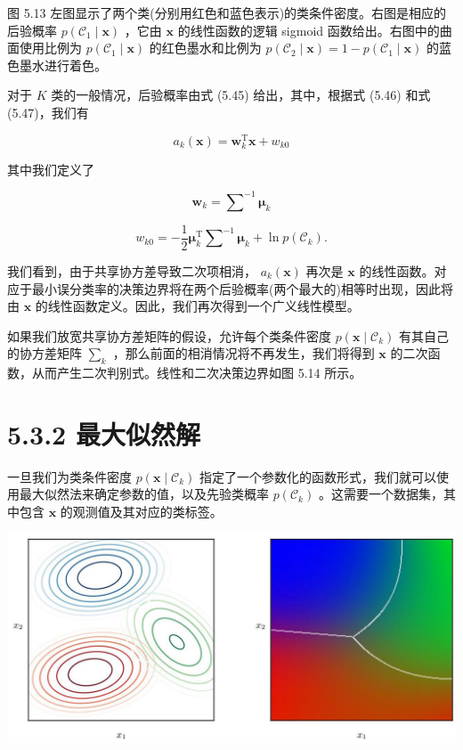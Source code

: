 \documentclass[10pt]{article}
\begin{document}
图 5.13 左图显示了两个类(分别用红色和蓝色表示)的类条件密度。右图是相应的后验概率 \(p\left( {{\mathcal{C}}_{1} \mid  \mathbf{x}}\right)\) ，它由 \(\mathbf{x}\) 的线性函数的逻辑 sigmoid 函数给出。右图中的曲面使用比例为 \(p\left( {{\mathcal{C}}_{1} \mid  \mathbf{x}}\right)\) 的红色墨水和比例为 \(p\left( {{\mathcal{C}}_{2} \mid  \mathbf{x}}\right)  = 1 - p\left( {{\mathcal{C}}_{1} \mid  \mathbf{x}}\right)\) 的蓝色墨水进行着色。

对于 \(K\) 类的一般情况，后验概率由式 (5.45) 给出，其中，根据式 (5.46) 和式 (5.47)，我们有

\[
{a}_{k}\left( \mathbf{x}\right)  = {\mathbf{w}}_{k}^{\mathrm{T}}\mathbf{x} + {w}_{k0} \tag{5.51}
\]

其中我们定义了

\[
{\mathbf{w}}_{k} = {\mathbf{\sum }}^{-1}{\mathbf{\mu }}_{k} \tag{5.52}
\]

\[
{w}_{k0} =  - \frac{1}{2}{\mathbf{\mu }}_{k}^{\mathrm{T}}{\mathbf{\sum }}^{-1}{\mathbf{\mu }}_{k} + \ln p\left( {\mathcal{C}}_{k}\right) . \tag{5.53}
\]

我们看到，由于共享协方差导致二次项相消， \({a}_{k}\left( \mathbf{x}\right)\) 再次是 \(\mathbf{x}\) 的线性函数。对应于最小误分类率的决策边界将在两个后验概率(两个最大的)相等时出现，因此将由 \(\mathbf{x}\) 的线性函数定义。因此，我们再次得到一个广义线性模型。

如果我们放宽共享协方差矩阵的假设，允许每个类条件密度 \(p\left( {\mathbf{x} \mid  {\mathcal{C}}_{k}}\right)\) 有其自己的协方差矩阵 \({\mathbf{\sum }}_{k}\) ，那么前面的相消情况将不再发生，我们将得到 \(\mathbf{x}\) 的二次函数，从而产生二次判别式。线性和二次决策边界如图 5.14 所示。

\section*{5.3.2 最大似然解}

一旦我们为类条件密度 \(p\left( {\mathbf{x} \mid  {\mathcal{C}}_{k}}\right)\) 指定了一个参数化的函数形式，我们就可以使用最大似然法来确定参数的值，以及先验类概率 \(p\left( {\mathcal{C}}_{k}\right)\) 。这需要一个数据集，其中包含 \(\mathbf{x}\) 的观测值及其对应的类标签。

\begin{center}
\includegraphics[max width=1.0\textwidth]{images/0194e279-9b28-703a-88f4-c3ac21e2010d_173_240_343_1308_611_0.jpg}
\end{center}
\hspace*{3em} 
\end{document}
